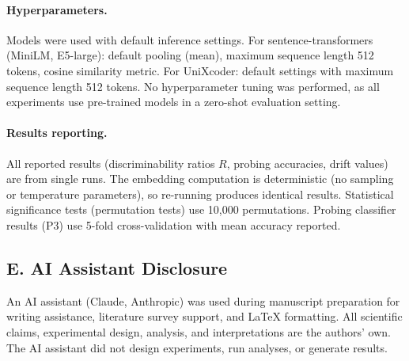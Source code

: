 \documentclass[11pt]{article}
\theoremstyle{definition}
\begin{document}
\paragraph{Hyperparameters.}
Models were used with default inference settings. For sentence-transformers (MiniLM, E5-large): default pooling (mean), maximum sequence length 512 tokens, cosine similarity metric. For UniXcoder: default settings with maximum sequence length 512 tokens. No hyperparameter tuning was performed, as all experiments use pre-trained models in a zero-shot evaluation setting.

\paragraph{Results reporting.}
All reported results (discriminability ratios $R$, probing accuracies, drift values) are from single runs. The embedding computation is deterministic (no sampling or temperature parameters), so re-running produces identical results. Statistical significance tests (permutation tests) use 10,000 permutations. Probing classifier results (P3) use 5-fold cross-validation with mean accuracy reported.

\subsection*{E. AI Assistant Disclosure}
An AI assistant (Claude, Anthropic) was used during manuscript preparation for writing assistance, literature survey support, and LaTeX formatting. All scientific claims, experimental design, analysis, and interpretations are the authors' own. The AI assistant did not design experiments, run analyses, or generate results.
\end{document}
